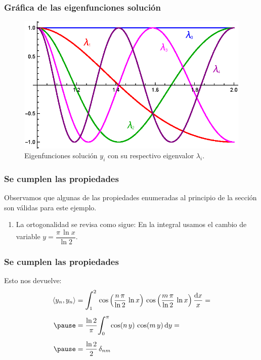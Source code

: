 \documentclass[12pt]{beamer}
\begin{document}
\begin{frame}
\frametitle{Gráfica de las eigenfunciones solución}
\begin{figure}
  \centering
  \includegraphics[scale=1.1]{Imagenes/Plot_Ejercicio_SL_03.eps}
  \caption{Eigenfunciones solución $y_{i}$ con su respectivo eigenvalor $\lambda_{i}$.}
  \label{fig:figura_04_02}
\end{figure}
\end{frame}
\begin{frame}
\frametitle{Se cumplen las propiedades}
Observamos que algunas de las propiedades enumeradas al principio de la sección son válidas para este ejemplo.
\pause
{}
\begin{enumerate}[<+->]
\conti
\item La ortogonalidad se revisa como sigue: En la integral usamos el cambio de variable $y = \dfrac{\pi \, \ln x}{\ln 2}$.
\end{enumerate}
\end{frame}
\begin{frame}
\frametitle{Se cumplen las propiedades}
Esto nos devuelve:
\pause
\begin{eqnarray}
\begin{aligned}[b]
\langle y_{n}, y_{n} \rangle &= \scaleint{6ex}_{\bs 1}^{2} \, \cos \left( \dfrac{n \, \pi}{\ln 2} \, \ln x \right) \, \cos \left( \dfrac{m \, \pi}{\ln 2} \, \ln x \right) \dfrac{\dd{x}}{x} = \\[0.5em] \pause
&= \dfrac{\ln 2}{\pi} \scaleint{6ex}_{\bs 0}^{\pi} \cos (n \, y) \, \cos (m \, y) \dd{y} = \\[0.5em] \pause
&= \dfrac{\ln 2}{2} \, \delta_{nm}
\end{aligned}
\label{eq:ecuacion_04_16}
\end{eqnarray}
\end{frame}                
\end{document}
